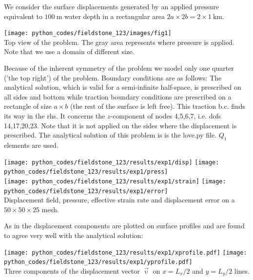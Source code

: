 We consider the surface displacements generated by an 
applied pressure equivalent to $\SI{100}{\meter}$ 
water depth in a rectangular area $2a\times 2b = 2\times 1~\si{\km}$. 

\begin{center}
\texttt{[image: python\_codes/fieldstone\_123/images/fig1]}\\
{\captionfont Top view of the problem. The gray area represents where 
pressure is applied. Note that we use a domain of different size.}
\end{center}

Because of the inherent symmetry of the problem we model only one quarter ('the top right')
of the problem. Boundary conditions are as follows: The analytical solution,
which is valid for a semi-infinite half-space, is prescribed on 
all sides and bottom while traction boundary conditions are prescribed on a 
rectangle of size $a\times b$ (the rest of the surface is left free).
This traction b.c. finds its way in the rhs. It concerns the $z$-component of
nodes 4,5,6,7, i.e. dofs 14,17,20,23. Note that it is not applied on the sides 
where the displacement is prescribed.
The analytical solution of this problem is is the {\pythonfile love.py} file.
$Q_1$ elements are used. 

\begin{center}
\texttt{[image: python\_codes/fieldstone\_123/results/exp1/disp]} 
\texttt{[image: python\_codes/fieldstone\_123/results/exp1/press]} \\
\texttt{[image: python\_codes/fieldstone\_123/results/exp1/strain]} 
\texttt{[image: python\_codes/fieldstone\_123/results/exp1/error]} \\
{\captionfont Displacement field, pressure, effective strain rate and 
displacement error on a $50\times 50\times 25$ mesh.}
\end{center} 

As in \textcite{bebe04} the displacement components are plotted on surface profiles
and are found to agree very well with the analytical solution:

\begin{center}
\texttt{[image: python\_codes/fieldstone\_123/results/exp1/xprofile.pdf]} 
\texttt{[image: python\_codes/fieldstone\_123/results/exp1/yprofile.pdf]} \\
{\captionfont Three components of the displacement vector $\vec{\upupsilon}$
on $x=L_x/2$ and $y=L_y/2$ lines.}
\end{center}


